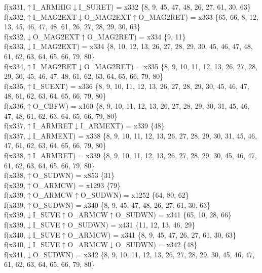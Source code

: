 f(x331,$\uparrow$I\_ARMHIG$\downarrow$I\_SURET) = x332 \{8, 9, 45, 47, 48, 26, 27, 61, 30, 63\} \\  
f(x332,$\uparrow$I\_MAG2EXT$\downarrow$O\_MAG2EXT$\uparrow$O\_MAG2RET) = x333 \{65, 66, 8, 12, 13, 45, 46, 47, 48, 61, 26, 27, 28, 29, 30, 63\} \\  
f(x332,$\downarrow$O\_MAG2EXT$\uparrow$O\_MAG2RET) = x334 \{9, 11\} \\  
f(x333,$\downarrow$I\_MAG2EXT) = x334 \{8, 10, 12, 13, 26, 27, 28, 29, 30, 45, 46, 47, 48, 61, 62, 63, 64, 65, 66, 79, 80\} \\  
f(x334,$\uparrow$I\_MAG2RET$\downarrow$O\_MAG2RET) = x335 \{8, 9, 10, 11, 12, 13, 26, 27, 28, 29, 30, 45, 46, 47, 48, 61, 62, 63, 64, 65, 66, 79, 80\} \\  
f(x335,$\uparrow$I\_SUEXT) = x336 \{8, 9, 10, 11, 12, 13, 26, 27, 28, 29, 30, 45, 46, 47, 48, 61, 62, 63, 64, 65, 66, 79, 80\} \\  
f(x336,$\uparrow$O\_CBFW) = x160 \{8, 9, 10, 11, 12, 13, 26, 27, 28, 29, 30, 31, 45, 46, 47, 48, 61, 62, 63, 64, 65, 66, 79, 80\} \\  
f(x337,$\uparrow$I\_ARMRET$\downarrow$I\_ARMEXT) = x339 \{48\} \\  
f(x337,$\downarrow$I\_ARMEXT) = x338 \{8, 9, 10, 11, 12, 13, 26, 27, 28, 29, 30, 31, 45, 46, 47, 61, 62, 63, 64, 65, 66, 79, 80\} \\  
f(x338,$\uparrow$I\_ARMRET) = x339 \{8, 9, 10, 11, 12, 13, 26, 27, 28, 29, 30, 45, 46, 47, 61, 62, 63, 64, 65, 66, 79, 80\} \\  
f(x338,$\uparrow$O\_SUDWN) = x853 \{31\} \\  
f(x339,$\uparrow$O\_ARMCW) = x1293 \{79\} \\  
f(x339,$\uparrow$O\_ARMCW$\uparrow$O\_SUDWN) = x1252 \{64, 80, 62\} \\  
f(x339,$\uparrow$O\_SUDWN) = x340 \{8, 9, 45, 47, 48, 26, 27, 61, 30, 63\} \\  
f(x339,$\downarrow$I\_SUVE$\uparrow$O\_ARMCW$\uparrow$O\_SUDWN) = x341 \{65, 10, 28, 66\} \\  
f(x339,$\downarrow$I\_SUVE$\uparrow$O\_SUDWN) = x431 \{11, 12, 13, 46, 29\} \\  
f(x340,$\downarrow$I\_SUVE$\uparrow$O\_ARMCW) = x341 \{8, 9, 45, 47, 26, 27, 61, 30, 63\} \\  
f(x340,$\downarrow$I\_SUVE$\uparrow$O\_ARMCW$\downarrow$O\_SUDWN) = x342 \{48\} \\  
f(x341,$\downarrow$O\_SUDWN) = x342 \{8, 9, 10, 11, 12, 13, 26, 27, 28, 29, 30, 45, 46, 47, 61, 62, 63, 64, 65, 66, 79, 80\} \\  
